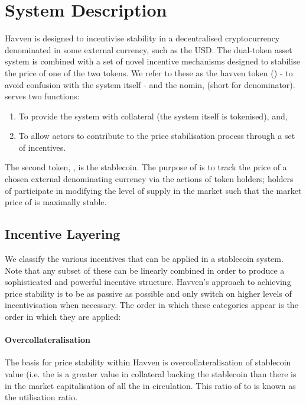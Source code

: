 \section{System Description} Havven is designed to incentivise stability in a decentralised cryptocurrency denominated in some external currency, such as the USD. The dual-token asset system is combined with a set of novel incentive mechanisms designed to stabilise the price of one of the two tokens. We refer to these as the havven token (\HAV{}) - to avoid confusion with the system itself - and the nomin, \NOM{} (short for denominator). \\

\noindent \HAV{} serves two functions:

\begin{enumerate}
\item{To provide the system with collateral (the system itself is tokenised), and,}
\item{To allow actors to contribute to the price stabilisation process through a set of incentives.}
\end{enumerate}

\noindent The second token, \NOM{}, is the stablecoin. The purpose of \NOM{} is to track the price of a chosen external denominating currency via the actions of \HAV{} token holders; holders of \HAV{} participate in modifying the level of supply in the \NOM{} market such that the market price of \NOM{} is maximally stable.

\subsection{Incentive Layering}

We classify the various incentives that can be applied in a stablecoin system. Note that any subset of these can be linearly combined in order to produce a sophisticated and powerful incentive structure. Havven's approach to achieving price stability is to be as passive as possible and only switch on higher levels of incentivisation when necessary. The order in which these categories appear is the order in which they are applied:

\paragraph{Overcollateralisation}

The basis for price stability within Havven is overcollateralisation of stablecoin value (i.e. the is a greater value in collateral backing the stablecoin than there is in the market capitalisation of all the \NOM{} in circulation. This ratio of \NOM{} to \HAV{} is known as the utilisation ratio.

